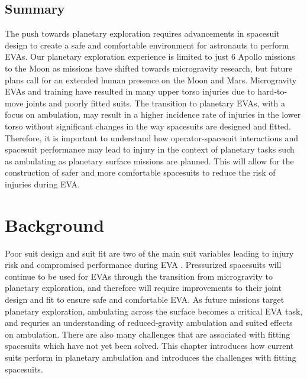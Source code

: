 \documentclass[defaultstyle,11pt]{comps}
\providecommand{\DIFaddbegin}{} %
\providecommand{\DIFaddend}{} %
\providecommand{\DIFdelbegin}{} %
\providecommand{\DIFdelend}{} %
\newcommand{\DIFscaledelfig}{0.5}
\newlength{\DIFdelgraphicswidth} %
\newlength{\DIFdelgraphicsheight} %
\newcommand{\DIFaddincludegraphics}[2][]{{\color{blue}\fbox{\DIFOincludegraphics[#1]{#2}}}} %
\newcommand{\DIFdelincludegraphics}[2][]{%
\sbox{\DIFdelgraphicsbox}{\DIFOincludegraphics[#1]{#2}}%
\settoboxwidth{\DIFdelgraphicswidth}{\DIFdelgraphicsbox} %
\settoboxtotalheight{\DIFdelgraphicsheight}{\DIFdelgraphicsbox} %
\scalebox{\DIFscaledelfig}{%
\parbox[b]{\DIFdelgraphicswidth}{\usebox{\DIFdelgraphicsbox}\\[-\baselineskip] \rule{\DIFdelgraphicswidth}{0em}}\llap{\resizebox{\DIFdelgraphicswidth}{\DIFdelgraphicsheight}{%
\setlength{\unitlength}{\DIFdelgraphicswidth}%
\begin{picture}(1,1)%
\thicklines\linethickness{2pt} %
{\color[rgb]{1,0,0}\put(0,0){\framebox(1,1){}}}%
{\color[rgb]{1,0,0}\put(0,0){\line( 1,1){1}}}%
{\color[rgb]{1,0,0}\put(0,1){\line(1,-1){1}}}%
\end{picture}%
}\hspace*{3pt}}} %
} %
\DeclareRobustCommand{\DIFaddbegin}{\DIFOaddbegin \let\includegraphics\DIFaddincludegraphics} %
\DeclareRobustCommand{\DIFaddend}{\DIFOaddend \let\includegraphics\DIFOincludegraphics} %
\DeclareRobustCommand{\DIFdelbegin}{\DIFOdelbegin \let\includegraphics\DIFdelincludegraphics} %
\DeclareRobustCommand{\DIFdelend}{\DIFOaddend \let\includegraphics\DIFOincludegraphics} %
\begin{document}
\hypertarget{summary}{%
\section{Summary}\label{summary}}

The push towards planetary exploration requires advancements in spacesuit design to create a safe and comfortable environment for astronauts to perform EVAs.
Our planetary exploration experience is limited to just 6 Apollo missions to the Moon as missions have shifted towards microgravity research, but future plans call for an extended human presence on the Moon and Mars.
Microgravity EVAs and training have resulted in many upper torso injuries due to hard-to-move joints and poorly fitted suits.
The transition to planetary EVAs, with a focus on ambulation, may result in a higher incidence rate of injuries in the lower torso without significant changes in the way spacesuits are designed and fitted.
Therefore, it is important to understand how operator-spacesuit interactions and spacesuit performance may lead to injury in the context of planetary tasks such as ambulating as planetary surface missions are planned.
This will allow for the construction of safer and more comfortable spacesuits to reduce the risk of injuries during EVA.

\DIFdelbegin %
\DIFdelend \DIFaddbegin \hypertarget{sec:BG}{%
\chapter{Background}\label{sec:BG}}
\DIFaddend 

Poor suit design and suit fit are two of the main suit variables leading to injury risk and compromised performance during EVA \citep{Chappell2017}.
Pressurized spacesuits will continue to be used for EVAs through the transition from microgravity to planetary exploration, and therefore will require improvements to their joint design and fit to ensure safe and comfortable EVA.
As future missions target planetary exploration, ambulating across the surface becomes a critical EVA task, and requries an understanding of reduced-gravity ambulation and suited effects on ambulation.
There are also many challenges that are associated with fitting spacesuits which have not yet been solved.
This chapter introduces how current suits perform in planetary ambulation and introduces the challenges with fitting spacesuits.
\end{document}
